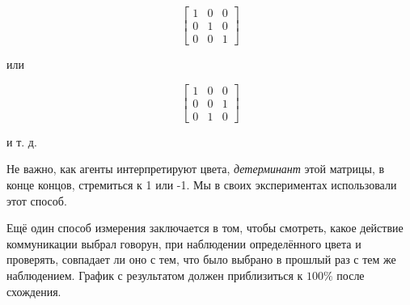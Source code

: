 \begin{equation*}
    \begin{bmatrix}
        1 & 0 & 0 \\
        0 & 1 & 0 \\
        0 & 0 & 1
    \end{bmatrix}
\end{equation*}

или

\begin{equation*}
    \begin{bmatrix}
        1 & 0 & 0 \\
        0 & 0 & 1 \\
        0 & 1 & 0
    \end{bmatrix}
\end{equation*}

и т. д.

Не важно, как агенты интерпретируют цвета, \textit{детерминант} этой матрицы, в конце концов, стремиться к 1 или -1. Мы в своих экспериментах использовали этот способ.

Ещё один способ измерения заключается в том, чтобы смотреть, какое действие коммуникации выбрал говорун, при наблюдении определённого цвета и проверять, совпадает ли оно с тем, что было выбрано в прошлый раз с тем же наблюдением. График с результатом должен приблизиться к $100\%$ после схождения.


